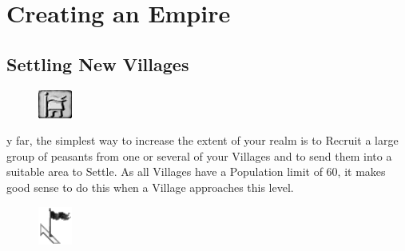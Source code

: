 
\chapter{Creating an Empire}


\section{Settling New Villages}

\begin{figure}
	\vspace{-20pt}
	\begin{center}
		\includegraphics[width=0.1\textwidth]{Tsettle}
	\end{center}
	\vspace{-20pt}
\end{figure}

y far, the simplest way to increase the extent of your realm is to Recruit a large group of peasants from one or several of your Villages and to send them into a suitable area to Settle. As all Villages have a Population limit of 60, it makes good sense to do this when a Village approaches this level.

\begin{figure}
	\vspace{-20pt}
	\begin{center}
		\includegraphics[width=0.1\textwidth]{Bflag}
	\end{center}
	\vspace{-20pt}
\end{figure}

